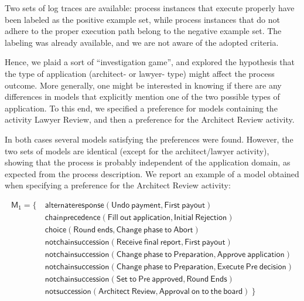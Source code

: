 Two sets of log traces are available: process instances that execute properly have been labeled as the positive example set, while process instances that do not adhere to the proper execution path belong to the negative example set. The labeling was already available, and we are not aware of the adopted criteria.

Hence, we plaid a sort of ``investigation game'', and explored the hypothesis that the type of application (architect- or lawyer- type) might affect the process outcome. More generally, one might be interested in knowing if there are any differences in models that explicitly mention one of the two possible types of application.
To this end, we specified a preference for models containing the activity \textsf{Lawyer Review}, and then a preference for the \textsf{Architect Review} activity.

In both cases several models satisfying the preferences were found. However, the two sets of models are identical (except for the architect/lawyer activity), showing that the process is probably independent of the application domain, as expected from the process description.
We report an example of a model obtained when specifying a preference for the \textsf{Architect Review} activity:


\begin{align*}
\mathsf{M_1} = \{ \ & \mathsf{ alternateresponse(Undo\ payment, First\ payout)} \\
& \mathsf{ chainprecedence(Fill\ out\ application, Initial\ Rejection)} \\
& \mathsf{ choice(Round\ ends, Change\ phase\ to\ Abort)} \\
& \mathsf{ notchainsuccession(Receive\ final\ report, First\ payout)} \\
& \mathsf{ notchainsuccession(Change\ phase\ to\ Preparation, Approve\ application)} \\
& \mathsf{ notchainsuccession(Change\ phase\ to\ Preparation, Execute\ Pre\ decision)} \\
& \mathsf{ notchainsuccession(Set\ to\ Pre\ approved, Round\ Ends)} \\
& \mathsf{ notsuccession(Architect\ Review, Approval\ on\ to\ the\ board)} \ \} 
\end{align*}

